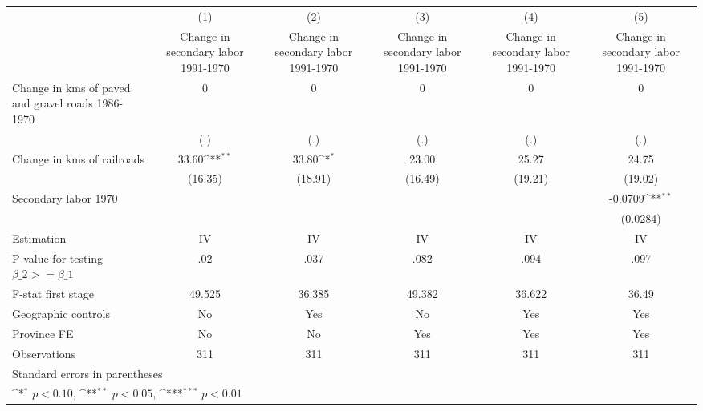 {
\def\sym#1{\ifmmode^{#1}\else\(^{#1}\)\fi}
\begin{tabular}{l*{5}{c}}
\hline\hline
                    &\multicolumn{1}{c}{(1)}&\multicolumn{1}{c}{(2)}&\multicolumn{1}{c}{(3)}&\multicolumn{1}{c}{(4)}&\multicolumn{1}{c}{(5)}\\
                    &\multicolumn{1}{c}{Change in secondary labor 1991-1970}&\multicolumn{1}{c}{Change in secondary labor 1991-1970}&\multicolumn{1}{c}{Change in secondary labor 1991-1970}&\multicolumn{1}{c}{Change in secondary labor 1991-1970}&\multicolumn{1}{c}{Change in secondary labor 1991-1970}\\
\hline
Change in kms of paved and gravel roads 1986-1970&           0         &           0         &           0         &           0         &           0         \\
                    &         (.)         &         (.)         &         (.)         &         (.)         &         (.)         \\
[1em]
Change in kms of railroads&       33.60\sym{**} &       33.80\sym{*}  &       23.00         &       25.27         &       24.75         \\
                    &     (16.35)         &     (18.91)         &     (16.49)         &     (19.21)         &     (19.02)         \\
[1em]
Secondary labor 1970&                     &                     &                     &                     &     -0.0709\sym{**} \\
                    &                     &                     &                     &                     &    (0.0284)         \\
\hline
Estimation          &          IV         &          IV         &          IV         &          IV         &          IV         \\
P-value for testing $\beta\_2 >= \beta\_1$&         .02         &        .037         &        .082         &        .094         &        .097         \\
F-stat first stage  &      49.525         &      36.385         &      49.382         &      36.622         &       36.49         \\
Geographic controls &          No         &         Yes         &          No         &         Yes         &         Yes         \\
Province FE         &          No         &          No         &         Yes         &         Yes         &         Yes         \\
Observations        &         311         &         311         &         311         &         311         &         311         \\
\hline\hline
\multicolumn{6}{l}{\footnotesize Standard errors in parentheses}\\
\multicolumn{6}{l}{\footnotesize \sym{*} \(p<0.10\), \sym{**} \(p<0.05\), \sym{***} \(p<0.01\)}\\
\end{tabular}
}
